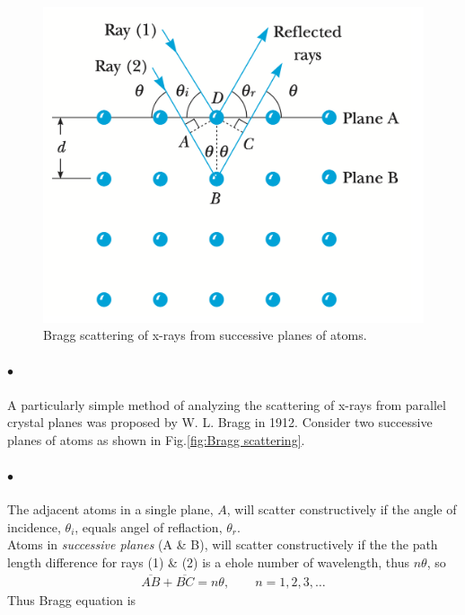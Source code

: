 \documentclass[a4paper]{report}
\begin{document}
            \begin{figure}
                \includegraphics[width=0.9\linewidth]{figures/x-ray acattering.png}
                \caption{Bragg scattering of x-rays from successive planes of atoms.}
                \label{fig:Bragg scattering}
            \end{figure}
            
            \paragraph{$\bullet$} A particularly simple method of analyzing the scattering of x-rays from parallel 
            crystal planes was proposed by W. L. Bragg in 1912. Consider two successive planes of atoms 
            as shown in Fig.\eqref{fig:Bragg scattering}.

            \paragraph{$\bullet$} The adjacent atoms in a single plane, $A$, will scatter constructively if the angle of 
            incidence, $\theta_i$, equals angel of reflaction, $\theta_r$.\\
            Atoms in \textit{successive planes} (A \& B), will scatter constructively if the the path length difference for rays (1) \& (2)
            is a ehole number of wavelength, thus $n\theta$, so 
            \begin{align}
                \label{The condition of scattering}
                \overline{AB} + \overline{BC} = n\theta, \qquad n=1, 2, 3, \dots
            \end{align}
            Thus Bragg equation is 
\end{document}
